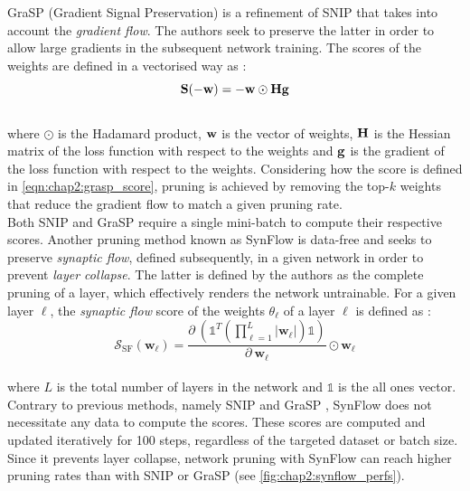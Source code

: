 GraSP (Gradient Signal Preservation) \cite{DBLP:conf/iclr/WangZG20} is a
refinement of SNIP that takes into account the \emph{gradient flow}. The authors
seek to preserve the latter in order to allow large gradients in the subsequent
network training. The scores of the weights are defined in a vectorised way as
:\\

\begin{equation}
  \label{eqn:chap2:grasp_score}
  \bf{S}(-\bf{w}) = -\bf{w} \odot \bf{H} \bf{g}
\end{equation}\\

\noindent where $\odot$ is the Hadamard product, $\bf{w}$ is the vector of
weights, $\bf{H}$ is the Hessian matrix of the loss function with respect to the
weights and $\bf{g}$ is the gradient of the loss function with respect to the
weights. Considering how the score is defined in \cref{eqn:chap2:grasp_score},
pruning is achieved by removing the top-$k$ weights that reduce the gradient
flow to match a given pruning rate.\\

Both SNIP and GraSP require a single mini-batch to compute their respective
scores. Another pruning method known as SynFlow
\cite{DBLP:conf/nips/TanakaKYG20} is data-free and seeks to preserve
\emph{synaptic flow}, defined subsequently, in a given network in order to
prevent \emph{layer collapse}. The latter is defined by the authors as the
complete pruning of a layer, which effectively renders the network untrainable.
For a given layer $\ell$, the \emph{synaptic flow} score of the weights
$\theta_\ell$ of a layer $\ell$ is defined as :\\

\begin{equation}
  \label{eqn:chap2:synflow_score}
  \mathcal{S}_\text{SF}(\mathbf{w}_\ell) = \displaystyle\frac{\partial ~ \left(\mathbb{1}^T \left( \displaystyle\prod_{\ell=1}^{L} | \mathbf{w}_\ell | \right) \mathbb{1}\right)}{\partial ~ \mathbf{w}_\ell} \odot \mathbf{w}_\ell
\end{equation}\\

\noindent where $L$ is the total number of layers in the network and
$\mathbb{1}$ is the all ones vector. Contrary to previous methods, namely SNIP
\cite{DBLP:conf/iclr/LeeAT19} and GraSP \cite{DBLP:conf/iclr/WangZG20}, SynFlow
does not necessitate any data to compute the scores. These scores are computed
and updated iteratively for 100 steps, regardless of the targeted dataset or
batch size. Since it prevents layer collapse, network pruning with SynFlow can
reach higher pruning rates than with SNIP or GraSP (see
\cref{fig:chap2:synflow_perfs}).\\

